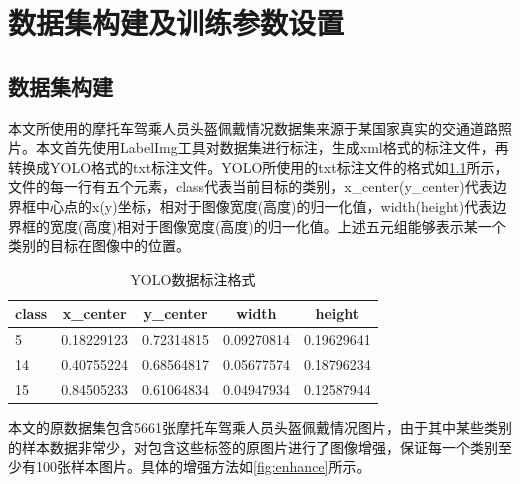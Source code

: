 \chapter{数据集构建及训练参数设置}

\section{数据集构建}
本文所使用的摩托车驾乘人员头盔佩戴情况数据集来源于某国家真实的交通道路照片。本文首先使用LabelImg工具对数据集进行标注，生成xml格式的标注文件，再转换成YOLO格式的txt标注文件。YOLO所使用的txt标注文件的格式如\ref{tab:format}所示，文件的每一行有五个元素，class代表当前目标的类别，x\_center(y\_center)代表边界框中心点的x(y)坐标，相对于图像宽度(高度)的归一化值，width(height)代表边界框的宽度(高度)相对于图像宽度(高度)的归一化值。上述五元组能够表示某一个类别的目标在图像中的位置。

\begin{table}[htb]
      \centering
      \caption[目标数据]{YOLO数据标注格式\label{tab:format}}
      \begin{tabular}{lrrrr}
          \toprule
          \multicolumn{1}{c}{class} & \multicolumn{1}{c}{x\_center} & \multicolumn{1}{c}{y\_center} & \multicolumn{1}{c}{width} & \multicolumn{1}{c}{height} \\
          \midrule
          5 & 0.18229123 & 0.72314815 & 0.09270814 & 0.19629641 \\
          14 & 0.40755224 & 0.68564817 & 0.05677574 & 0.18796234 \\
          15 & 0.84505233 & 0.61064834 & 0.04947934 & 0.12587944 \\
          \bottomrule
      \end{tabular}
\end{table}


本文的原数据集包含5661张摩托车驾乘人员头盔佩戴情况图片，由于其中某些类别的样本数据非常少，对包含这些标签的原图片进行了图像增强，保证每一个类别至少有100张样本图片。具体的增强方法如\ref{fig:enhance}所示。

